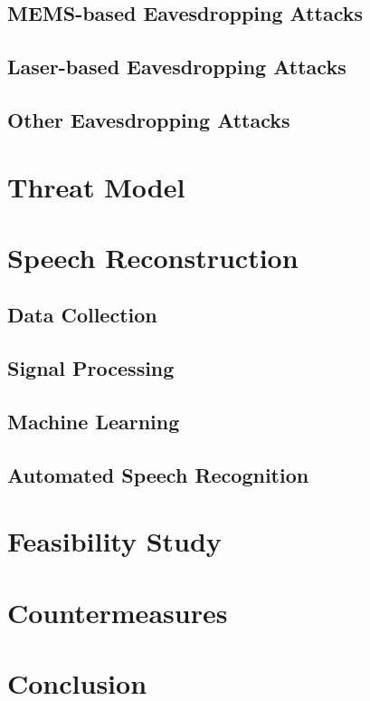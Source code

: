 \documentclass[sigconf, nonacm]{acmart}
\begin{document}
\subsection{MEMS-based Eavesdropping Attacks}
\subsection{Laser-based Eavesdropping Attacks}
\subsection{Other Eavesdropping Attacks}
\section{Threat Model}
\section{Speech Reconstruction}
\subsection{Data Collection}
\subsection{Signal Processing}
\subsection{Machine Learning}
\subsection{Automated Speech Recognition}
\section{Feasibility Study}
\section{Countermeasures}
\section{Conclusion}
\end{document}
